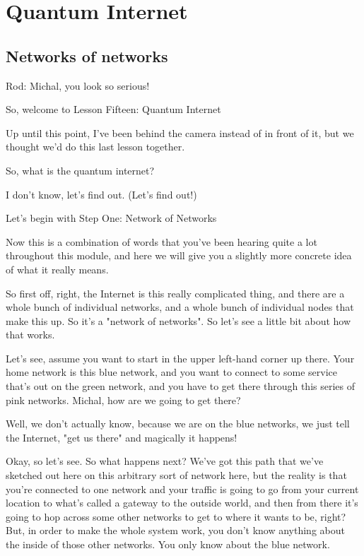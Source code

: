 \chapter{Quantum Internet}

\section{Networks of networks}

Rod: Michal, you look so serious!

So, welcome to Lesson Fifteen: Quantum Internet

Up until this point, I've been behind the camera instead of in front of it, but we thought we'd do this last lesson together.

So, what is the quantum internet?

I don't know, let's find out. (Let's find out!)

Let's begin with Step One: Network of Networks

Now this is a combination of words that you've been hearing quite a lot throughout this module, and here we will give you a slightly more concrete idea of what it really means.

So first off, right, the Internet is this really complicated thing, and there are a whole bunch of individual networks, and a whole bunch of individual nodes that make this up. So it's a "network of networks". So let's see a little bit about how that works.

Let's see, assume you want to start in the upper left-hand corner up there. Your home network is this blue network, and you want to connect to some service that's out on the green network, and you have to get there through this series of pink networks. Michal, how are we going to get there?

Well, we don't actually know, because we are on the blue networks, we just tell the Internet, "get us there" and magically it happens!

Okay, so let's see. So what happens next? We've got this path that we've sketched out here on this arbitrary sort of network here, but the reality is that you're connected to one network and your traffic is going to go from your current location to what's called a gateway to the outside world, and then from there it's going to hop across some other networks to get to where it wants to be, right? But, in order to make the whole system work, you don't know anything about the inside of those other networks. You only know about the blue network.

